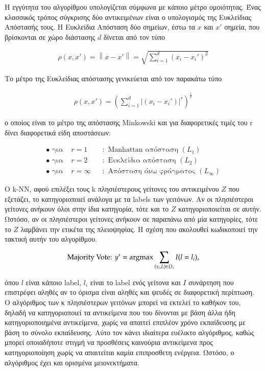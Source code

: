 \documentclass[12pt]{article}
\newcommand{\norm}[1]{\left\lVert#1\right\rVert}
\newcommand{\argmax}{\operatornamewithlimits{argmax}}
\begin{document}
Η εγγύτητα του αλγορίθμου υπολογίζεται σύμφωνα με κάποιο μέτρο ομοιότητας. Ένας κλασσικός τρόπος σύγκρισης δύο αντικειμένων είναι ο υπολογισμός της Ευκλείδιας Απόστασής τους. Η Ευκλείδια Απόσταση δύο σημείων, έστω τα \(x\) και \(x'\) σημεία, που βρίσκονται σε χώρο διάστασης \(d\) δίνεται από τον τύπο

\begin{align*}
	ρ(x,x') = \norm{x- x'} =\sqrt{\sum_{i=1}^{d}(x_i - x_{i}')^2}
\end{align*}

Το μέτρο της Ευκλείδιας απόστασης γενικεύεται από τον παρακάτω τύπο

\begin{align*}
	ρ(x,x') = (\sum_{i=1}^{d}|(x_i - x_{i}')|^r)^{\frac{1}{r}}
\end{align*}

ο οποίος είναι το μέτρο της απόστασης Minkowski και για διαφορετικές τιμές του r δίνει διαφορετικά είδη αποστάσεων:

\begin{align*}
	\bullet \text{ για } &r = 1 &&: \text{ Manhattan απόσταση } (L_1) \\
	\bullet \text{ για } &r = 2 &&: \text{ Ευκλείδια απόσταση } (L_2) \\
	\bullet \text{ για } &r = \infty &&: \text{ Απόσταση άνω φράγματος } (L_{\infty})
\end{align*}

O k-NN, αφού επιλέξει τους k πλησιέστερους γείτονες του αντικειμένου \(Z\) που εξετάζει, το κατηγοριοποιεί ανάλογα με τα labels των γειτόνων. Αν οι πλησιέστεροι γείτονες ανήκουν όλοι στην ίδια κατηγορία, τότε και το \(Ζ\) κατηγοριοποιείται σε αυτήν. Ωστόσο, αν οι πλησιέστεροι γείτονες ανήκουν σε παραπάνω από μία κατηγορίες, τότε το \(Z\) λαμβάνει την ετικέτα της πλειοψηφίας. Η σχέση που ακολουθεί κωδικοποιεί την τακτική αυτήν του αλγορίθμου.

\begin{align*}
	\text{Majority Vote: } y' = \argmax \sum_{(x_i, l_i) \in D_z} I(l = l_i),
\end{align*}

όπου \(l\) είναι κάποιο label, \(l_i\) είναι το label ενός γείτονα και \(I\) συνάρτηση που επιστρέφει αληθές αν το όρισμα είναι αληθές και ψευδές σε διαφορετική περίπτωση. \\

Ο αλγόριθμος των κ πλησιέστερων γειτόνων μπορεί να εκτελεί το καθήκον του, δηλαδή να κατηγοριοποιεί τα αντικείμενα που του δίνονται με βάση άλλα ήδη κατηγοριοποιημένα αντικείμενα, χωρίς να απαιτεί επιπλέον χρόνο εκπαίδευσης με βάση το σύνολο εκπαίδευσης. Αύτο τον κάνει ιδιαίτερα ευέλικτο αλγόριθμος, καθώς μπορεί οποιαδήποτε στιγμή να προσθέσεις καινούρια αντικείμενα προς κατηγοριοποίηση χωρίς να απαιτείται καμία επιπροσθετη ενέργεια. Ωστόσο, ο αλγόριθμος έχει και ορισμένα μειονεκτήματα. \\
\end{document}
